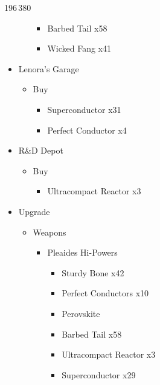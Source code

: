 \begin{shop}{196\,380}
\begin{itemize}
\begin{itemize}
\begin{itemize}
						\item Barbed Tail x58
						\item Wicked Fang x41
					\end{itemize}
			\end{itemize}
		\item Lenora's Garage
			\begin{itemize}
				\item Buy
					\begin{itemize}
						\item Superconductor x31
						\item Perfect Conductor x4
					\end{itemize}
			\end{itemize}
		\item R\&D Depot
			\begin{itemize}
				\item Buy
					\begin{itemize}
						\item Ultracompact Reactor x3
					\end{itemize}
			\end{itemize}									
	\end{itemize}
\end{shop}

\begin{upgrade}
	\begin{itemize}
		\item Upgrade
			\begin{itemize}
				\item Weapons
					\begin{itemize}
						\item Pleaides Hi-Powers
							\begin{itemize}
								\item Sturdy Bone x42
								\item Perfect Conductors x10
								\item Perovskite
								\item Barbed Tail x58
								\item Ultracompact Reactor x3
								\item Superconductor x29
							\end{itemize}
					\end{itemize}
			\end{itemize}
	\end{itemize}
\end{upgrade}

